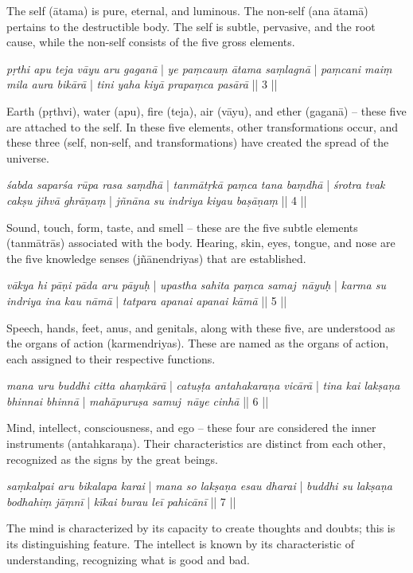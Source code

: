 The self (ātama) is pure, eternal, and luminous. The non-self (ana ātamā) pertains to the destructible body. The self is subtle, pervasive, and the root cause, while the non-self consists of the five gross elements.

\textit{pṛthi apu teja vāyu aru gaganā} | \textit{ye paṃcauṃ ātama saṃlagnā} | 
\textit{paṃcani maiṃ mila aura bikārā} | \textit{tini yaha kiyā prapaṃca pasārā} || 3 ||

Earth (pṛthvi), water (apu), fire (teja), air (vāyu), and ether (gaganā) – these five are attached to the self. In these five elements, other transformations occur, and these three (self, non-self, and transformations) have created the spread of the universe.

\textit{śabda saparśa rūpa rasa saṃdhā} | \textit{tanmātṛkā paṃca tana baṃdhā} | 
\textit{śrotra tvak cakṣu jihvā ghrāṇaṃ} | \textit{jñnāna su indriya kiyau baṣāṇaṃ} || 4 || 

Sound, touch, form, taste, and smell – these are the five subtle elements (tanmātrās) associated with the body. Hearing, skin, eyes, tongue, and nose are the five knowledge senses (jñānendriyas) that are established.

\textit{vākya hi pāṇi pāda aru pāyuḥ} | \textit{upastha sahita paṃca samaj~nāyuḥ} |
\textit{karma su indriya ina kau nāmā} | \textit{tatpara apanai apanai kāmā} || 5 || 

Speech, hands, feet, anus, and genitals, along with these five, are understood as the organs of action (karmendriyas). These are named as the organs of action, each assigned to their respective functions.

\textit{mana uru buddhi citta ahaṃkārā} | \textit{catuṣṭa antahakaraṇa vicārā} | 
\textit{tina kai lakṣaṇa bhinnai bhinnā} | \textit{mahāpuruṣa samuj~nāye cinhā} || 6 || 

Mind, intellect, consciousness, and ego – these four are considered the inner instruments (antahkaraṇa). Their characteristics are distinct from each other, recognized as the signs by the great beings.

\textit{saṃkalpai aru bikalapa karai} | \textit{mana so lakṣaṇa esau dharai} |
\textit{buddhi su lakṣaṇa bodhahiṃ jāṃnī} | \textit{kīkai burau leī pahicānī} || 7 ||

The mind is characterized by its capacity to create thoughts and doubts; this is its distinguishing feature. The intellect is known by its characteristic of understanding, recognizing what is good and bad.

